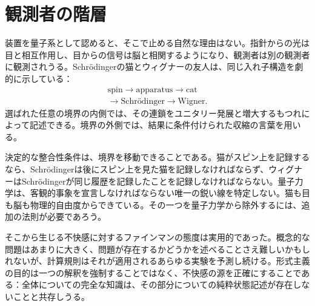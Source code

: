 \begin{classroomqa}
\end{classroomqa}

\section{観測者の階層}

装置を量子系として認めると、そこで止める自然な理由はない。指針からの光は目と相互作用し、目からの信号は脳と相関するようになり、観測者は別の観測者に観測されうる。Schr\"odingerの猫とウィグナーの友人は、同じ入れ子構造を劇的に示している：
\begin{equation}
\begin{gathered}
\text{spin}
\longrightarrow
\text{apparatus}
\longrightarrow
\text{cat}\\
\longrightarrow
\text{Schr\"odinger}
\longrightarrow
\text{Wigner}.
\end{gathered}
\label{eq:l7-observer-chain}
\end{equation}
選ばれた任意の境界の内側では、その連鎖をユニタリー発展と増大するもつれによって記述できる。境界の外側では、結果に条件付けられた収縮の言葉を用いる。

決定的な整合性条件は、境界を移動できることである。猫がスピン上を記録するなら、Schr\"odingerは後にスピン上を見た猫を記録しなければならず、ウィグナーはSchr\"odingerが同じ履歴を記録したことを記録しなければならない。量子力学は、客観的事象を宣言しなければならない唯一の鋭い線を特定しない。猫も目も脳も物理的自由度からできている。その一つを量子力学から除外するには、追加の法則が必要であろう。

そこから生じる不快感に対するファインマンの態度は実用的であった。概念的な問題はあまりに大きく、問題が存在するかどうかを述べることさえ難しいかもしれないが、計算規則はそれが適用されるあらゆる実験を予測し続ける。形式主義の目的は一つの解釈を強制することではなく、不快感の源を正確にすることである：全体についての完全な知識は、その部分についての純粋状態記述が存在しないことと共存しうる。

\begin{classroomqa}
\end{classroomqa}

